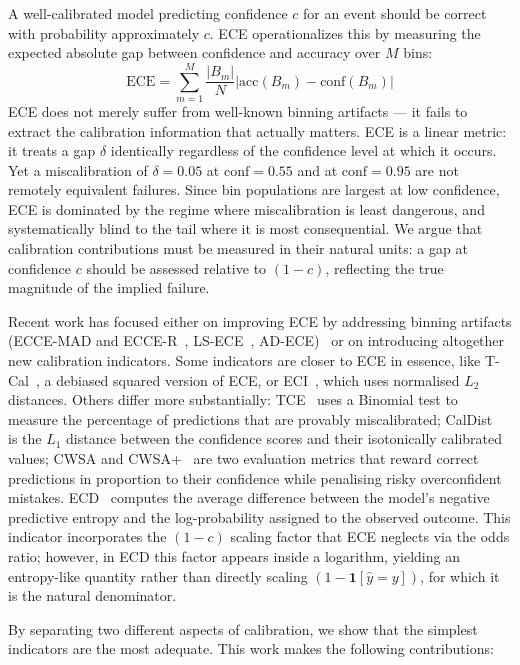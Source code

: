 \documentclass{article}
\theoremstyle{plain}
\theoremstyle{definition}
\theoremstyle{remark}
\begin{document}
A well-calibrated model predicting confidence $c$ for an event should be correct with probability approximately $c$. ECE operationalizes this by measuring the expected absolute gap between confidence and accuracy over $M$ bins:
$$\text{ECE} = \sum_{m=1}^{M} \frac{|B_m|}{N} \left| \text{acc}(B_m) - \text{conf}(B_m) \right|$$
ECE does not merely suffer from well-known binning artifacts — it fails to extract the calibration information that actually matters. ECE is a linear metric: it treats a gap $\delta$ identically regardless of the confidence level at which it occurs. Yet a miscalibration of $\delta = 0.05$ at $\text{conf} = 0.55$ and at $\text{conf} = 0.95$ are not remotely equivalent failures. Since bin populations are largest at low confidence, ECE is dominated by the regime where miscalibration is least dangerous, and systematically blind to the tail where it is most consequential. We argue that calibration contributions must be measured in their natural units: a gap at confidence $c$ should be assessed relative to $(1-c)$, reflecting the true magnitude of the implied failure. 

Recent work has focused either on improving ECE by addressing binning artifacts (ECCE-MAD and ECCE-R~\cite{arrietaibarra2022metrics}, LS-ECE~\cite{chidambaram2024flawed}, AD-ECE)~\cite{vaicenavicius2019evaluating} or on introducing altogether new calibration indicators. Some indicators are closer to ECE in essence, like T-Cal~\cite{lee2023tcal}, a debiased squared version of ECE, or ECI~\cite{famiglini2023rigorous}, which uses normalised $L_2$ distances. Others differ more substantially: TCE~\cite{matsubara2023tce} uses a Binomial test to measure the percentage of predictions that are provably miscalibrated; CalDist~\cite{qiao2024distance} is the $L_1$ distance between the confidence scores and their isotonically calibrated values; CWSA and CWSA+~\cite{shahnazari2025cwsa} are two evaluation metrics that reward correct predictions in proportion to their confidence while penalising risky overconfident mistakes. ECD~\cite{sumler2025entropic}  computes the average difference between the model's negative predictive entropy and the log-probability assigned to the observed outcome. This indicator incorporates the $(1-c)$ scaling factor that ECE neglects via the odds ratio; however, in ECD this factor appears inside a logarithm, yielding an entropy-like quantity rather than directly scaling $(1 - \mathbf{1}[\hat{y} = y])$, for which it is the natural denominator. 

By separating two different aspects of calibration, we show that the simplest indicators are the most adequate. This work makes the following contributions:
\end{document}
